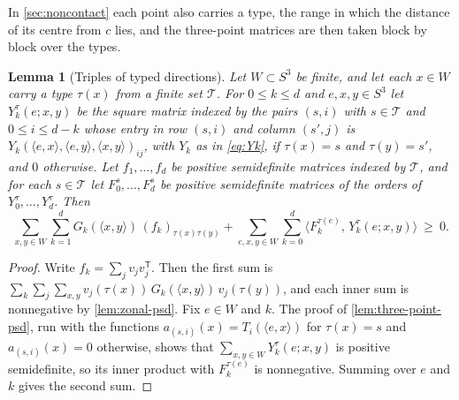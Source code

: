 \documentclass[11pt,reqno]{amsart}
\renewcommand{\_}{\origunderscore\allowbreak}
\numberwithin{equation}{section}
\theoremstyle{plain}
\newtheorem{lem}[thm]{Lemma}
\theoremstyle{definition}
\theoremstyle{remark}
\begin{document}
In \cref{sec:noncontact} each point also carries a type, the range in
which the distance of its centre from $c$ lies, and the three-point
matrices are then taken block by block over the types.

\begin{lem}[Triples of typed directions]\label{lem:typed-triples}
Let $W\subset S^3$ be finite, and let each $x\in W$ carry a type $\tau(x)$
from a finite set $\mathcal T$. For $0\le k\le d$ and $e,x,y\in S^3$ let
$Y^\tau_k(e;x,y)$ be the square matrix indexed by the pairs $(s,i)$ with
$s\in\mathcal T$ and $0\le i\le d-k$ whose entry in row $(s,i)$ and column
$(s',j)$ is $Y_k(\langle e,x\rangle,\langle e,y\rangle,\langle x,y\rangle)_{ij}$,
with $Y_k$ as in \eqref{eq:Yk}, if $\tau(x)=s$ and $\tau(y)=s'$, and $0$
otherwise. Let $f_1,\dots,f_d$ be positive semidefinite matrices indexed by
$\mathcal T$, and for each $s\in\mathcal T$ let $F^s_0,\dots,F^s_d$ be
positive semidefinite matrices of the orders of $Y^\tau_0,\dots,Y^\tau_d$.
Then
\begin{equation}\label{eq:typed-triples}
  \sum_{x,y\in W}\sum_{k=1}^dG_k(\langle x,y\rangle)\,(f_k)_{\tau(x)\tau(y)}
  +\sum_{e,x,y\in W}\sum_{k=0}^d\bigl\langle F^{\tau(e)}_k,\,Y^\tau_k(e;x,y)\bigr\rangle\ \ge\ 0 .
\end{equation}
\end{lem}

\begin{proof}
Write $f_k=\sum_jv_jv_j^{\mathsf T}$. Then the first sum is
$\sum_k\sum_j\sum_{x,y}v_j(\tau(x))\,G_k(\langle x,y\rangle)\,v_j(\tau(y))$,
and each inner sum is nonnegative by \cref{lem:zonal-psd}. Fix $e\in W$ and $k$. The proof of
\cref{lem:three-point-psd}, run with the functions
$a_{(s,i)}(x)=T_i(\langle e,x\rangle)$ for $\tau(x)=s$ and
$a_{(s,i)}(x)=0$ otherwise, shows that $\sum_{x,y\in W}Y^\tau_k(e;x,y)$ is
positive semidefinite, so its inner product with $F^{\tau(e)}_k$ is
nonnegative. Summing over $e$ and $k$ gives the second sum.
\end{proof}
\end{document}
